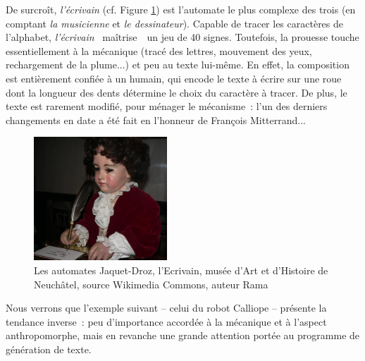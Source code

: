 \documentclass{article}
\begin{document}
				De surcroît, \textit{l'écrivain} (cf. Figure \ref{fig:automate_jaquet_droz}) est l'automate le plus complexe des trois (en comptant \textit{la musicienne} et \textit{le dessinateur}). Capable de tracer les caractères de l'alphabet, \textit{l'écrivain} \guillemotleft~maîtrise~\guillemotright~un jeu de 40 signes. Toutefois, la prouesse touche essentiellement à la mécanique (tracé des lettres, mouvement des yeux, rechargement de la plume...) et peu au texte lui-même. En effet, la composition est entièrement confiée à un humain, qui encode le texte à écrire sur une roue dont la longueur des dents détermine le choix du caractère à tracer. De plus, le texte est rarement modifié, pour ménager le mécanisme~: l'un des derniers changements en date a été fait en l'honneur de François Mitterrand...
				\begin{figure}[H]
					\centering
					\includegraphics[width=5cm]{automate_jaquet_droz.jpg}
					\caption{Les automates Jaquet-Droz, l'Ecrivain, musée d'Art et d'Histoire de Neuchâtel, source Wikimedia Commons, auteur Rama}
					\label{fig:automate_jaquet_droz}
				\end{figure}
				Nous verrons que l'exemple suivant -- celui du robot Calliope -- présente la tendance inverse~: peu d'importance accordée à la mécanique et à l'aspect anthropomorphe, mais en revanche une grande attention portée au programme de génération de texte.
\end{document}
